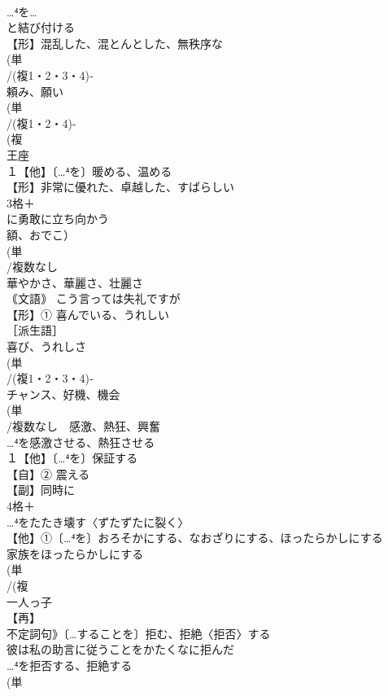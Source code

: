 \documentclass[8pt]{extreport}
\begin{document}
\begin{CJK}{UTF8}{min}
\\	…⁴を…
\\	と結び付ける
\\	【形】混乱した、混とんとした、無秩序な 
\\	(単
\\	/(複1・2・3・4)‐
\\	頼み、願い 
\\	(単
\\	/(複1・2・4)-
\\	(複
\\	王座 
\\	１【他】〔…⁴を〕暖める、温める 
\\	【形】非常に優れた、卓越した、すばらしい 
\\	3格＋
\\	に勇敢に立ち向かう 
\\	額、おでこ）
\\	(単
\\	/複数なし 
\\	華やかさ、華麗さ、壮麗さ
\\	｟文語｠ こう言っては失礼ですが
\\	【形】① 喜んでいる、うれしい 
\\	［派生語］ 
\\	喜び、うれしさ
\\	(単
\\	/(複1・2・3・4)‐
\\	チャンス、好機、機会
\\	(単
\\	/複数なし　感激、熱狂、興奮 
\\	…⁴を感激させる、熱狂させる
\\	１【他】〔…⁴を〕保証する 
\\	【自】② 震える
\\	【副】同時に
\\	4格＋
\\	…⁴をたたき壊す〈ずたずたに裂く〉
\\	【他】①〔…⁴を〕おろそかにする、なおざりにする、ほったらかしにする 
\\	家族をほったらかしにする
\\	(単
\\	/(複
\\	一人っ子 
\\	【再】
\\	不定詞句》〔…することを〕拒む、拒絶〈拒否〉する 
\\	彼は私の助言に従うことをかたくなに拒んだ 
\\	…⁴を拒否する、拒絶する
\\	(単

\end{CJK}
\end{document}
